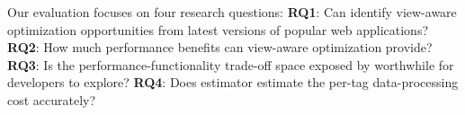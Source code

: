
\label{sec:eva}
Our evaluation focuses on four research questions:
{\bf RQ1}: Can \Tool identify view-aware optimization opportunities from latest versions
    of popular web applications?
{\bf RQ2}: How much performance benefits can view-aware optimization provide?
{\bf RQ3}: Is the performance-functionality trade-off space exposed by \Tool worthwhile for developers to explore?
{\bf RQ4}: Does \Tool estimator estimate the per-tag data-processing cost accurately?
\begin{table}[t]											
\centering											
\caption{Opportunities detected by \Tool in 12 apps}												
\label{tab:oppo}										\centering
{}	
\end{table}

